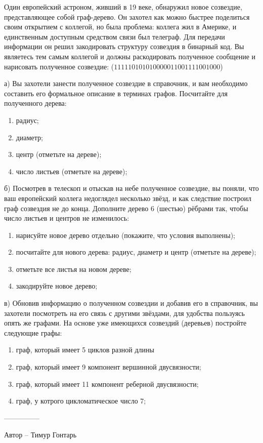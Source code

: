 \question
Один европейский астроном, живший в 19 веке, обнаружил новое созвездие, представляющее собой граф-дерево. Он захотел как можно быстрее поделиться своим открытием с коллегой, но была проблема: коллега жил в Америке, и единственным доступным средством связи был телеграф. Для передачи информации он решил закодировать структуру созвездия в бинарный код. Вы являетесь тем самым коллегой и должны раскодировать полученное сообщение и нарисовать полученное созвездие: ($111110101010000011001111001000$)

а) Вы захотели занести полученное созвездие в справочник, и вам необходимо составить его формальное описание в терминах графов. Посчитайте для полученного дерева:
\begin{enumerate}
\item радиус;
\item диаметр;
\item центр (отметьте на дереве);
\item число листьев (отметьте на дереве);
\end{enumerate}

б) Посмотрев в телескоп и отыскав на небе полученное созвездие, вы поняли, что ваш европейский коллега недоглядел несколько звёзд, и как следствие построил граф созвездия не до конца. Дополните дерево 6 (шестью) рёбрами так, чтобы число листьев и центров не изменилось:
\begin{enumerate}
\item нарисуйте новое дерево отдельно (покажите, что условия выполнены);
\item посчитайте для нового дерева: радиус, диаметр и центр (отметьте на дереве);
\item отметьте все листья на новом дереве;
\item закодируйте новое дерево;
\end{enumerate}

в) Обновив информацию о полученном созвездии и добавив его в справочник, вы захотели посмотреть на его связь с другими звёздами, для удобства пользуясь опять же графами. На основе уже имеющихся созвездий (деревьев) постройте следующие графы:
\begin{enumerate}
\item граф, который имеет 5 циклов разной длины
\item граф, который имеет 9 компонент вершинной двусвязности;
\item граф, который имеет 11 компонент реберной двусвязности;
\item граф, у котрого цикломатическое число 7;
\end{enumerate}

---------------

Автор -- Тимур Гонтарь
